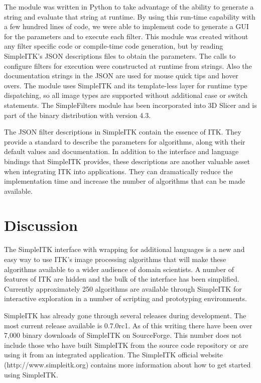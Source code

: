 \documentclass{frontiersMED} %
\begin{document}
The module was written in Python to take advantage of the ability
to generate a string and evaluate that string at runtime.
By using this run-time capability with a few hundred lines of
code, we were able to implement code to generate a GUI for the
parameters and to execute each filter. This module was created without any
filter specific code or compile-time code generation, but by
reading SimpleITK's JSON descriptions files to obtain the
parameters. The calls to configure filters for execution were
constructed at runtime from strings. Also the documentation
strings in the JSON are used for mouse quick tips and hover overs. The
module uses SimpleITK and its template-less layer for runtime type
dispatching, so all image types are supported without additional case
or switch statements. The SimpleFilters module has been incorporated
into 3D Slicer and is part of the binary distribution with version 4.3.

The JSON filter descriptions in SimpleITK contain the essence of
ITK. They provide a standard to describe the parameters for
algorithms, along with their default values and documentation. In
addition to the interface and language bindings that SimpleITK provides,
these descriptions are another valuable asset when integrating ITK into
applications. They can dramatically reduce the implementation time and
increase the number of algorithms that can be made available.

\section{Discussion}
The SimpleITK interface with wrapping for additional languages is a new
and easy way to use ITK's image processing algorithms that will
make these algorithms available to a wider audience of domain scientists.
A number of features of ITK are hidden and the bulk of
the interface has been simplified. Currently approximately 250
algorithms are available through SimpleITK for interactive
exploration in a number of scripting and prototyping environments.

SimpleITK has already gone through several releases during
development. The most current release available is 0.7.0rc1. As of
this writing there have been over 7,000 binary downloads of SimpleITK
on SourceForge. This number does not include those who have built SimpleITK
from the source code repository or are using it from an integrated
application. The SimpleITK official website (http://www.simpleitk.org)
contains more information about how to get started using SimpleITK.
\end{document}

